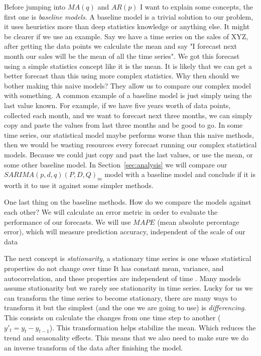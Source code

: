 \documentclass[journal]{IEEEtran}
\begin{document}
Before jumping into $MA(q)$ and $AR(p)$ I want to explain some concepts, the
first one is \emph{baseline models}. A baseline model is a trivial solution
to our problem, it uses heuristics more than deep statistics knowledge or
anything else. It might be clearer if we use an example. Say we have a time
series on the sales of XYZ, after getting the data points we calculate the
mean and say "I forecast next month our sales will be the mean of all the time
series". We got this forecast using a simple statistics concept like it is the
mean. It is likely that  we can get a better forecast than this using more
complex statistics. Why then should we bother making this naive models? They
allow us to compare our complex model with something. A common example of a
baseline model is just simply using the last value known. For example, if we
have five years worth of data points, collected each month, and we want to
forecast next three months, we can simply copy and paste the values from last
three months and be good to go. In some time series, our statistical model
maybe performs worse than this naive methods, then we would be wasting
resources every forecast running our complex statistical models. Because we
could just copy and past the last values, or use the mean, or some other
baseline model. In Section~\ref {sec:analysis} we will compare our
$SARIMA(p,d,q)(P,D,Q)_m$ model with a baseline model and conclude if it is
worth it to use it against some simpler methods.

One last thing on the baseline methods. How do we compare the models against
each other? We will calculate an error metric in order to evaluate the
performance of our forecasts. We will use $MAPE$ (mean absolute percentage
error), which will measure prediction accuracy, independent of the scale of
our data

The next concept is \emph{stationarity}, a stationary time series is one whose
statistical properties do not change over time It has constant mean, variance,
and autocorrelation, and these properties are independent of time
\cite{timeseries}. Many models assume stationarity but we rarely see
stationarity in time series. Lucky for us we can transform the time series to
become stationary, there are many ways to transform it but the simplest (and
the one we are going to use) is \emph{differencing}. This consists on
calculate the changes from one time step to another ($y'_t = y_t - y_{t-1}$). This transformation helps
stabilize the mean. Which reduces the trend and seasonality effects. This
means that we also need to make sure we do an inverse transform of the data
after finishing the model.
\end{document}

